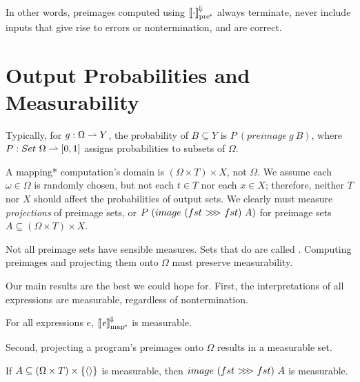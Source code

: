 In other words, preimages computed using $\left\llbracket{\cdot}\right\rrbracket^{\mspace{-2mu}\Downarrow\mspace{-2mu}}_\mathrm{pre^{\mspace{-2mu}*}}$ always terminate, never include inputs that give rise to errors or nontermination, and are correct.


\section{Output Probabilities and Measurability}
\label{sec:measurability}

Typically, for $g : \Omega \rightharpoonup Y$, the probability of $B \subseteq Y$ is $P~(preimage~g~B)$, where $P : Set~\Omega \rightharpoonup [0,1]$ assigns probabilities to subsets of $\Omega$.

A mapping* computation's domain is $(\Omega \times T) \times X$, not $\Omega$.
We assume each $\omega \in \Omega$ is randomly chosen, but not each $t \in T$ nor each $x \in X$; therefore, neither $T$ nor $X$ should affect the probabilities of output sets.
We clearly must measure \emph{projections} of preimage sets, or $P~(image~(fst~{>}\mspace{-6mu}{>}\mspace{-6mu}{>}~fst)~A)$ for preimage sets $A \subseteq (\Omega \times T) \times X$. 

Not all preimage sets have sensible measures.
Sets that do are called .
Computing preimages and projecting them onto $\Omega$ must preserve measurability.

Our main results are the best we could hope for.
First, the interpretations of all expressions are measurable, regardless of nontermination.

\begin{theorem}
\label{thm:proto-all-programs-measurable}
For all expressions $\mathit{e}$, $\left\llbracket{\mathit{e}}\right\rrbracket^{\mspace{-2mu}\Downarrow\mspace{-2mu}}_\mathrm{map^{\mspace{-2mu}*}}$ is measurable.
\end{theorem}

Second, projecting a program's preimages onto $\Omega$ results in a measurable set.

\begin{theorem}
\label{thm:proto-all-projections-measurable}
If $A \subseteq (\Omega \times T) \times \{{\langle{}\rangle}\}$ is measurable, then $image~(fst~{>}\mspace{-6mu}{>}\mspace{-6mu}{>}~fst)~A$ is measurable.
\end{theorem}

